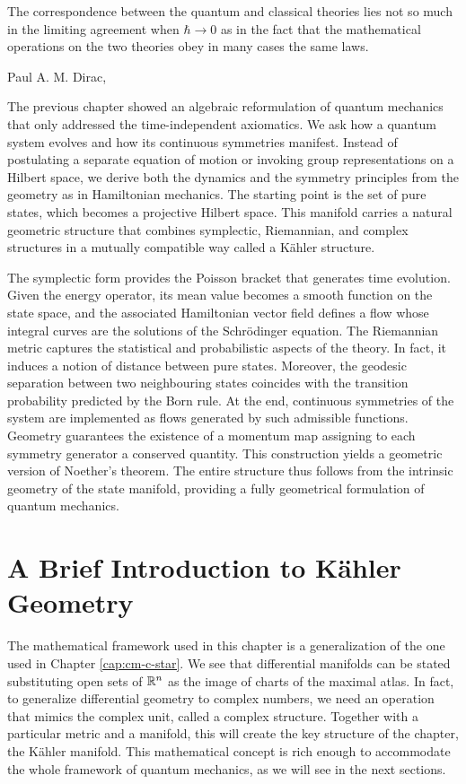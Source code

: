 \epigraph{The correspondence between the quantum and classical theories lies not so much in the limiting agreement when $\hbar \to 0$ as in the fact that the mathematical operations on the two theories obey in many cases the same laws.}{Paul A. M. Dirac, \cite{diracFundamentalEquationsQuantum1925}}


The previous chapter showed an algebraic reformulation of quantum mechanics that only addressed the time-independent axiomatics. We ask how a quantum system evolves and how its continuous symmetries manifest. Instead of postulating a separate equation of motion or invoking group representations on a Hilbert space, we derive both the dynamics and the symmetry principles from the geometry as in Hamiltonian mechanics. The starting point is the set of pure states, which becomes a projective Hilbert space. This manifold carries a natural geometric structure that combines symplectic, Riemannian, and complex structures in a mutually compatible way called a Kähler structure. 

The symplectic form provides the Poisson bracket that generates time evolution. Given the energy operator, its mean value becomes a smooth function on the state space, and the associated Hamiltonian vector field defines a flow whose integral curves are the solutions of the Schrödinger equation. The Riemannian metric captures the statistical and probabilistic aspects of the theory. In fact, it induces a notion of distance between pure states. Moreover, the geodesic separation between two neighbouring states coincides with the transition probability predicted by the Born rule. At the end, continuous symmetries of the system are implemented as flows generated by such admissible functions. Geometry guarantees the existence of a momentum map assigning to each symmetry generator a conserved quantity. This construction yields a geometric version of Noether’s theorem. The entire structure thus follows from the intrinsic geometry of the state manifold, providing a fully geometrical formulation of quantum mechanics.
	
\section{A Brief Introduction to Kähler Geometry}
\label{sec:almost-kahler-hilbertian}
The mathematical framework used in this chapter is a generalization of the one used in Chapter \ref{cap:cm-c-star}. We see that differential manifolds can be stated substituting open sets of $\mathbb{R}^n$ as the image of charts of the maximal atlas. In fact, to generalize differential geometry to complex numbers, we need an operation that mimics the complex unit, called a complex structure. Together with a particular metric and a manifold, this will create the key structure of the chapter, the Kähler manifold. This mathematical concept is rich enough to accommodate the whole framework of quantum mechanics, as we will see in the next sections.

